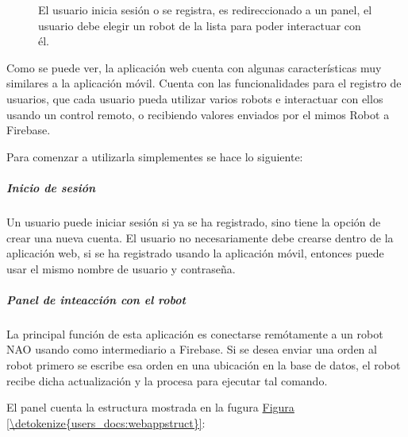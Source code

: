 \begin{figure}[htbp]
\centering
\capstart

\noindent{}
\caption{El usuario inicia sesión o se registra, es redireccionado a un panel, el usuario debe elegir un robot de la lista para poder interactuar con él.}\label{\detokenize{users_docs:webappflow}}\end{figure}

Como se puede ver, la aplicación web cuenta con algunas características
muy similares a la aplicación móvil. Cuenta con las funcionalidades para
el registro de usuarios, que cada usuario pueda utilizar varios robots e
interactuar con ellos usando un control remoto, o recibiendo valores enviados
por el mimos Robot a Firebase.

Para comenzar a utilizarla simplementes se hace lo siguiente:


\subparagraph{Inicio de sesión}
\label{\detokenize{inicio-de-sesion}}
Un usuario puede iniciar sesión si ya se ha registrado, sino tiene la opción
de crear una nueva cuenta. El usuario no necesariamente debe crearse dentro
de la aplicación web, si se ha registrado usando la aplicación móvil, entonces
puede usar el mismo nombre de usuario y contraseña.


\subparagraph{Panel de inteacción con el robot}
\label{\detokenize{users_docs:panel-de-inteaccion-con-el-robot}}
La principal función de esta aplicación es conectarse remótamente a un robot
NAO usando como intermediario a Firebase. Si se desea enviar una orden al robot
primero se escribe esa orden en una ubicación en la base de datos, el robot
recibe dicha actualización y la procesa para ejecutar tal comando.

El panel cuenta la estructura mostrada en la fugura \hyperref[\detokenize{users_docs:webappstruct}]{Figura \ref{\detokenize{users_docs:webappstruct}}}:

